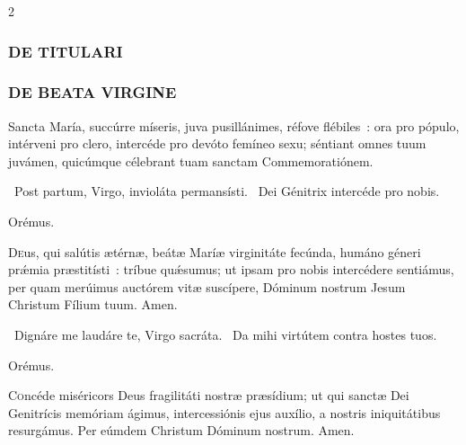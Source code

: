 \documentclass[9pt,twoside]{extarticle}
\begin{document}
\begin{multicols}{2}
{{\subsubsection*{\center \textsc{DE TITULARI}}
\begin{center}\end{center}

\subsubsection*{\center \textsc{DE BEATA VIRGINE}}
\begin{tightlist}{}
\item {}
\item {} Sancta María, succúrre míseris, juva pusillánimes, réfove flébiles~: ora pro pópulo, intérveni pro clero, intercéde pro devóto femíneo sexu; séntiant omnes tuum juvámen, quicúmque célebrant tuam sanctam Commemoratiónem.
\item {}
\item {}~Post partum, Virgo, invioláta permansísti. ~Dei Génitrix intercéde pro nobis.
\item Orémus. \hfill {}
\end{tightlist}
\lettrine{D}eus, qui salútis ætérnæ, beátæ Maríæ virginitáte fecúnda, humáno géneri prǽmia præstitísti~: tríbue quǽsumus; ut ipsam pro nobis intercédere sentiámus, per quam merúimus auctórem vitæ suscípere, Dóminum nostrum Jesum Christum Fílium tuum. Amen.

\begin{tightlist}{}
\item {}
\item {}~Dignáre me laudáre te, Virgo sacráta. ~Da mihi virtútem contra hostes tuos.
\item Orémus. \hfill {}
\end{tightlist}
\lettrine{C}oncéde miséricors Deus fragilitáti nostræ præsídium; ut qui sanctæ Dei Genitrícis memóriam ágimus, intercessiónis ejus auxílio, a nostris iniquitátibus resurgámus. Per eúmdem Christum Dóminum nostrum. Amen.

}}
\end{multicols}
\end{document}
